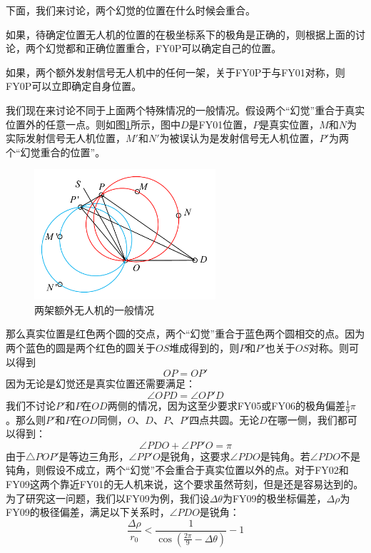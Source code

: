 \documentclass[12pt,AutoFakeSlant,AutoFakeBold]{article}
\begin{document}
下面，我们来讨论，两个幻觉的位置在什么时候会重合。

如果，待确定位置无人机的位置的在极坐标系下的极角是正确的，则根据上面的讨论，两个幻觉都和正确位置重合，FY0P可以确定自己的位置。

如果，两个额外发射信号无人机中的任何一架，关于FY0P于与FY01对称，则FY0P可以立即确定自身位置。

我们现在来讨论不同于上面两个特殊情况的一般情况。假设两个“幻觉”重合于真实位置外的任意一点。则如图\ref{fig:两架无人机}所示，图中$D$是FY01位置，$P$是真实位置，$M$和$N$为实际发射信号无人机位置，$M'$和$N'$为被误认为是发射信号无人机位置，$P'$为两个“幻觉重合的位置”。

\begin{figure}[!ht]
    \centering
    \includegraphics[width = 0.6\textwidth]{图片/两架无人机情况.pdf}
    \caption{两架额外无人机的一般情况}
    \label{fig:两架无人机}
\end{figure}

那么真实位置是红色两个圆的交点，两个“幻觉”重合于蓝色两个圆相交的点。因为两个蓝色的圆是两个红色的圆关于$OS$堆成得到的，则$P$和$P'$也关于$OS$对称。则可以得到
\begin{equation}
    OP = OP'
\end{equation}
因为无论是幻觉还是真实位置还需要满足：
\begin{equation}
    \angle OPD = \angle OP'D
\end{equation}
我们不讨论$P'$和$P$在$OD$两侧的情况，因为这至少要求FY05或FY06的极角偏差$\frac{1}{9}\pi$。那么则$P'$和$P$在$OD$同侧，$O$、$D$、$P$、$P'$四点共圆。无论$D$在哪一侧，我们都可以得到：
\begin{equation}
    \angle PDO + \angle PP'O = \pi
\end{equation}
由于$\bigtriangleup POP'$是等边三角形，$\angle PP'O$是锐角，这要求$\angle PDO$是钝角。若$\angle PDO$不是钝角，则假设不成立，两个“幻觉”不会重合于真实位置以外的点。对于FY02和FY09这两个靠近FY01的无人机来说，这个要求虽然苛刻，但是还是容易达到的。为了研究这一问题，我们以FY09为例，我们设$\Delta\theta$为FY09的极坐标偏差，$\Delta\rho$为FY09的极径偏差，满足以下关系时，$\angle PDO$是锐角：
\begin{equation}
    \frac{\Delta\rho}{r_0} < \frac{1}{\cos\left(\frac{2\pi}{9}-\Delta\theta\right)} - 1
    \label{eq:极径偏差关系}
\end{equation}
\end{document}
